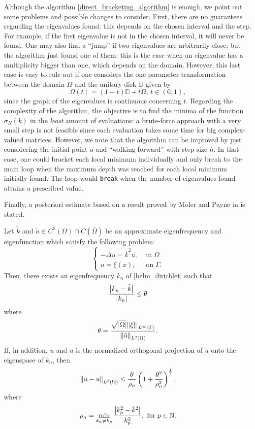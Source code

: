 \begin{remark}
    Although the algorithm \ref{direct_bracketing_algorithm} is enough, we point out some problems and possible changes to consider. First, there are no guarantees regarding the eigenvalues found: this depends on the chosen interval and the step. For example, if the first eigenvalue is not in the chosen interval, it will never be found. One may also find a ``jump'' if two eigenvalues are arbitrarily close, but the algorithm just found one of them: this is the case when an eigenvalue has a multiplicity bigger than one, which depends on the domain. However, this last case is easy to rule out if one considers the one parameter transformation between the domain \(\Omega\) and the unitary disk \(\mathbb{D}\) given by
    \[
        \Omega(t) = (1-t)\mathbb{D} + t \Omega, \, t \in (0, 1),
    \]
    since the graph of the eigenvalues is continuous concerning \(t\). Regarding the complexity of the algorithm, the objective is to find the minima of the function \(\sigma_N(k)\) in the \textit{least} amount of evaluations: a brute-force approach with a very small step is not feasible since each evaluation takes some time for big complex-valued matrices. However, we note that the algorithm can be improved by just considering the initial point \(a\) and ``walking forward'' with step size \(h\). In that case, one could bracket each local minimum individually and only break to the main loop when the maximum depth was reached for each local minimum initially found. The loop would \texttt{break} when the number of eigenvalues found attains a prescribed value.
\end{remark}

Finally, a posteriori estimate based on a result proved by Moler and Payne in \cite{moler1968bounds} is stated.
\begin{theorem}
    Let \(\tilde{k}\) and \(\tilde{u} \in C^2(\Omega) \cap C(\overline{\Omega})\) be an approximate eigenfrequency and eigenfunction which satisfy the following problem:
    \[
    \begin{cases}
        -\Delta \tilde{u} = \tilde{k}^2 u, &\text{ in } \Omega\\
        u = \xi(x), &\text{ on } \Gamma.
    \end{cases}    
    \]
    Then, there exists an eigenfrequency \(k_n\) of \eqref{helm_dirichlet} such that
    \[
        \frac{\abs{{k_n} - {\tilde{k}}}}{\abs{k_n}} \leq \theta
    \]
    where
    \[
        \theta = \frac{\sqrt{\abs{\Omega}} \norm*{\xi}_{L^\infty (\Gamma)}}{\norm{\tilde{u}}_{L^2(\Omega)}}.
    \]
    If, in addition, \(\tilde{u}\) and \(u\) is the normalized orthogonal projection of \(\tilde{u}\) onto the eigenspace of \(k_n\), then
    \[
        \norm{\tilde{u} - u}_{L^2(\Omega)} \leq \frac{\theta}{\rho_n}\left(1+\frac{\theta^2}{\rho_n^2}\right)^\frac{1}{2},
    \]
    where
    \[
        \rho_n = \min_{k_n \neq k_p} \frac{\abs{k^2_p - \tilde{k}^2}}{k^2_p}, \text{ for } p \in \mathbb{N}.
    \]
\end{theorem}

